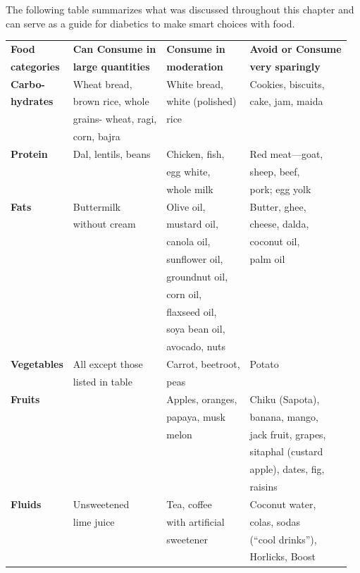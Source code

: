 The following table summarizes what was discussed throughout this chapter and can serve as a guide for diabetics to make smart choices with food.

{
\small\addtolength{\tabcolsep}{-5pt}
\begin{longtable}{|l|l|l|l|}
\hline
\textbf{Food} & \textbf{Can Consume in} & \textbf{Consume in} & \textbf{Avoid or Consume}\\
\textbf{categories} & \textbf{large quantities} & \textbf{moderation} & \textbf{very sparingly}\\
\hline
\textbf{Carbo-} & Wheat bread, & White bread, & Cookies, biscuits,\\
\textbf{hydrates} & brown rice, whole & white (polished) & cake, jam, maida\\
 & grains- wheat, ragi, & rice & \\
 & corn, bajra &  & \\
\hline
\textbf{Protein} & Dal, lentils, beans & Chicken, fish, & Red meat—goat,\\
 &  & egg white, & sheep, beef,\\
 &  & whole milk & pork; egg yolk\\
\hline
\textbf{Fats} & Buttermilk & Olive oil, & Butter, ghee,\\
 & without cream & mustard oil, & cheese, dalda,\\
 &  & canola oil, & coconut oil,\\
 &  & sunflower oil, & palm oil\\
 &  & groundnut oil, & \\
 &  & corn oil, & \\
 &  & flaxseed oil, & \\
 &  & soya bean oil, & \\
 &  & avocado, nuts & \\
\hline
\textbf{Vegetables} & All except those & Carrot, beetroot, & Potato\\
 & listed in table & peas & \\
\hline
\textbf{Fruits} &  & Apples, oranges, & Chiku (Sapota),\\
 &  & papaya, musk & banana, mango,\\
 &  & melon & jack fruit, grapes,\\
 &  &  & sitaphal (custard\\
 &  &  & apple), dates, fig,\\
 &  &  & raisins\\
\hline
\textbf{Fluids} & Unsweetened & Tea, coffee & Coconut water,\\
 & lime juice & with artificial & colas, sodas\\
 &  & sweetener & (“cool drinks”),\\
 &  &  & Horlicks, Boost\\
\hline
\end{longtable}
}\relax


